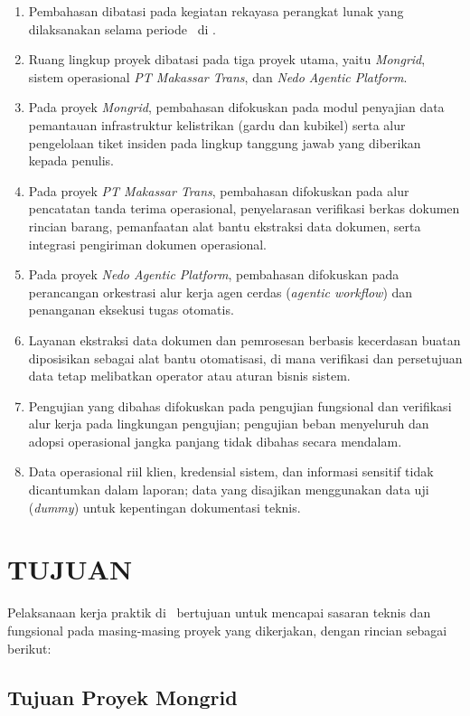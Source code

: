 \begin{enumerate}[label=\alph*., leftmargin=*, itemsep=0pt]
  \item Pembahasan dibatasi pada kegiatan rekayasa perangkat lunak yang dilaksanakan selama periode \PeriodeKP\ di \NamaPerusahaan.
  \item Ruang lingkup proyek dibatasi pada tiga proyek utama, yaitu \textit{Mongrid}, sistem operasional \textit{PT Makassar Trans}, dan \textit{Nedo Agentic Platform}.
  \item Pada proyek \textit{Mongrid}, pembahasan difokuskan pada modul penyajian data pemantauan infrastruktur kelistrikan (gardu dan kubikel) serta alur pengelolaan tiket insiden pada lingkup tanggung jawab yang diberikan kepada penulis.
  \item Pada proyek \textit{PT Makassar Trans}, pembahasan difokuskan pada alur pencatatan tanda terima operasional, penyelarasan verifikasi berkas dokumen rincian barang, pemanfaatan alat bantu ekstraksi data dokumen, serta integrasi pengiriman dokumen operasional.
  \item Pada proyek \textit{Nedo Agentic Platform}, pembahasan difokuskan pada perancangan orkestrasi alur kerja agen cerdas (\textit{agentic workflow}) dan penanganan eksekusi tugas otomatis.
  \item Layanan ekstraksi data dokumen dan pemrosesan berbasis kecerdasan buatan diposisikan sebagai alat bantu otomatisasi, di mana verifikasi dan persetujuan data tetap melibatkan operator atau aturan bisnis sistem.
  \item Pengujian yang dibahas difokuskan pada pengujian fungsional dan verifikasi alur kerja pada lingkungan pengujian; pengujian beban menyeluruh dan adopsi operasional jangka panjang tidak dibahas secara mendalam.
  \item Data operasional riil klien, kredensial sistem, dan informasi sensitif tidak dicantumkan dalam laporan; data yang disajikan menggunakan data uji (\textit{dummy}) untuk kepentingan dokumentasi teknis.
\end{enumerate}

\section{TUJUAN}

Pelaksanaan kerja praktik di \NamaPerusahaan\ bertujuan untuk mencapai sasaran teknis dan fungsional pada masing-masing proyek yang dikerjakan, dengan rincian sebagai berikut:

\subsection{Tujuan Proyek Mongrid}

